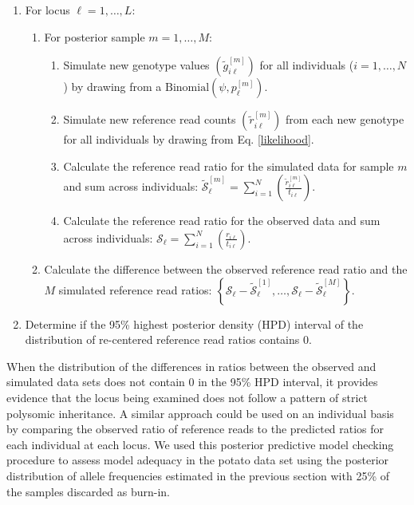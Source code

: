 \documentclass[11pt,english,letterpaper,oneside]{article}
\begin{document}
\begin{enumerate}
  \item For locus $\ell = 1,\ldots,L$:
  \begin{enumerate}[label={\arabic{enumi}.\arabic*.}]
    \item For posterior sample $m = 1,\ldots,M$:
    \begin{enumerate}[label={\arabic{enumi}.\arabic{enumi}.\arabic*.}]
      \item Simulate new genotype values $\left( \tilde{g}_{i \ell}^{[m]}\right)$ for all individuals ($i = 1,\ldots,N$) by drawing from a $\text{Binomial}\left( \psi,p_{\ell}^{[m]} \right)$.
      \item Simulate new reference read counts $\left( \tilde{r}_{i \ell}^{[m]} \right)$ from each new genotype for all individuals by drawing from Eq. \ref{likelihood}.
      \item Calculate the reference read ratio for the simulated data for sample $m$ and sum across individuals: $\mathcal{\tilde{S}}_{\ell}^{[m]} = \sum_{i=1}^{N} \left(\frac{\tilde{r}_{i \ell}^{[m]}}{t_{i \ell}} \right)$.
      \item Calculate the reference read ratio for the observed data and sum across individuals: $\mathcal{S}_{\ell} = \sum_{i=1}^{N} \left(\frac{r_{i \ell}}{t_{i \ell}} \right)$.
    \end{enumerate}
    \item Calculate the difference between the observed reference read ratio and the $M$ simulated reference read ratios: $\left\{ \mathcal{S}_{\ell}-\mathcal{\tilde{S}}_{\ell}^{[1]},\ldots,\mathcal{S}_{\ell}-\mathcal{\tilde{S}}_{\ell}^{[M]}\right\}$.
\end{enumerate}
\item Determine if the 95\% highest posterior density (HPD) interval of the distribution of re-centered reference read ratios contains 0.
\end{enumerate}
\medskip

When the distribution of the differences in ratios between the observed and simulated data sets does not contain 0 in the 95\% HPD interval, it provides evidence that the locus being examined does not follow a pattern of strict polysomic inheritance. A similar approach could be used on an individual basis by comparing the observed ratio of reference reads to the predicted ratios for each individual at each locus. We used this posterior predictive model checking procedure to assess model adequacy in the potato data set using the posterior distribution of allele frequencies estimated in the previous section with 25\% of the samples discarded as burn-in. 
\medskip
\end{document}
